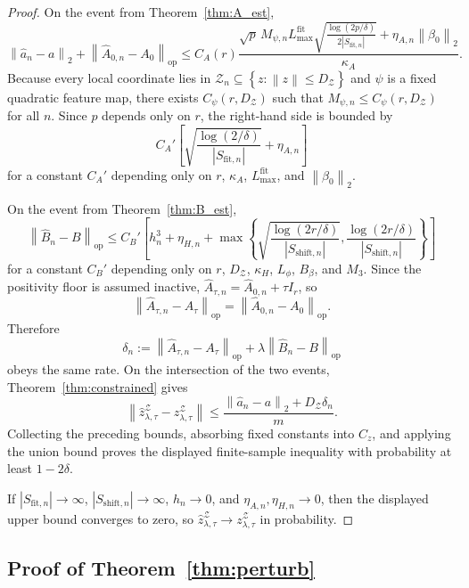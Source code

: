 \documentclass{article}
\newcommand{\cZ}{\mathcal{Z}}
\newcommand{\norm}[1]{\left\lVert #1 \right\rVert}
\newcommand{\abs}[1]{\left\lvert #1 \right\rvert}
\newcommand{\bracks}[1]{\left[ #1 \right]}
\newcommand{\braces}[1]{\left\{ #1 \right\}}
\begin{document}
\begin{proof}
On the event from Theorem~\ref{thm:A_est},
\[
\norm{\hat a_n-a}_2 + \norm{\hat A_{0,n}-A_0}_{\mathrm{op}}
\le
C_A(r)
\frac{
\sqrt{p}\,M_{\psi,n}L_{\max}^{\mathrm{fit}}\sqrt{\frac{\log(2p/\delta)}{2\abs{S_{\mathrm{fit},n}}}}
+
\eta_{A,n}\norm{\beta_0}_2
}{\kappa_A}.
\]
Because every local coordinate lies in \(\cZ_n\subseteq \braces{z:\norm{z}\le D_\cZ}\) and \(\psi\) is a fixed quadratic feature map, there exists \(C_\psi(r,D_\cZ)\) such that \(M_{\psi,n}\le C_\psi(r,D_\cZ)\) for all \(n\). Since \(p\) depends only on \(r\), the right-hand side is bounded by
\[
C_A'
\bracks{
\sqrt{\frac{\log(2/\delta)}{\abs{S_{\mathrm{fit},n}}}}
+
\eta_{A,n}
}
\]
for a constant \(C_A'\) depending only on \(r\), \(\kappa_A\), \(L_{\max}^{\mathrm{fit}}\), and \(\norm{\beta_0}_2\).

On the event from Theorem~\ref{thm:B_est},
\[
\norm{\hat B_n-B}_{\mathrm{op}}
\le
C_B'
\bracks{
h_n^3 + \eta_{H,n}
+
\max\braces{
\sqrt{\frac{\log(2r/\delta)}{\abs{S_{\mathrm{shift},n}}}},
\frac{\log(2r/\delta)}{\abs{S_{\mathrm{shift},n}}}
}
}
\]
for a constant \(C_B'\) depending only on \(r\), \(D_\cZ\), \(\kappa_H\), \(L_\phi\), \(B_\beta\), and \(M_3\). Since the positivity floor is assumed inactive, \(\hat A_{\tau,n}=\hat A_{0,n}+\tau I_r\), so
\[
\norm{\hat A_{\tau,n}-A_\tau}_{\mathrm{op}}=\norm{\hat A_{0,n}-A_0}_{\mathrm{op}}.
\]
Therefore
\[
\delta_n
:=
\norm{\hat A_{\tau,n}-A_\tau}_{\mathrm{op}} + \lambda\norm{\hat B_n-B}_{\mathrm{op}}
\]
obeys the same rate. On the intersection of the two events, Theorem~\ref{thm:constrained} gives
\[
\norm{\hat z_{\lambda,\tau}^{\cZ} - z_{\lambda,\tau}^{\cZ}}
\le
\frac{\norm{\hat a_n-a}_2 + D_\cZ \delta_n}{m}.
\]
Collecting the preceding bounds, absorbing fixed constants into \(C_z\), and applying the union bound proves the displayed finite-sample inequality with probability at least \(1-2\delta\).

If \(\abs{S_{\mathrm{fit},n}}\to\infty\), \(\abs{S_{\mathrm{shift},n}}\to\infty\), \(h_n\to 0\), and \(\eta_{A,n},\eta_{H,n}\to 0\), then the displayed upper bound converges to zero, so \(\hat z_{\lambda,\tau}^{\cZ}\to z_{\lambda,\tau}^{\cZ}\) in probability.
\end{proof}

\subsection{Proof of Theorem~\ref{thm:perturb}}
\end{document}
